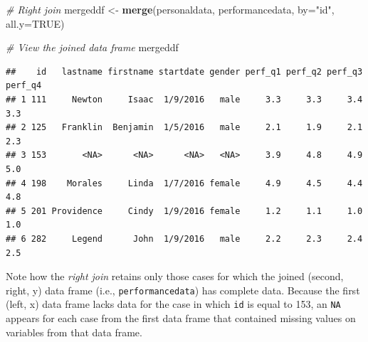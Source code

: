 \documentclass[]{book}
\newenvironment{Shaded}{\begin{snugshade}}{\end{snugshade}}
\newcommand{\KeywordTok}[1]{\textcolor[rgb]{0.13,0.29,0.53}{\textbf{#1}}}
\newcommand{\DataTypeTok}[1]{\textcolor[rgb]{0.13,0.29,0.53}{#1}}
\newcommand{\StringTok}[1]{\textcolor[rgb]{0.31,0.60,0.02}{#1}}
\newcommand{\CommentTok}[1]{\textcolor[rgb]{0.56,0.35,0.01}{\textit{#1}}}
\newcommand{\OtherTok}[1]{\textcolor[rgb]{0.56,0.35,0.01}{#1}}
\newcommand{\NormalTok}[1]{#1}
\begin{document}
\begin{Shaded}
\begin{Highlighting}[]
\CommentTok{# Right join }
\NormalTok{mergeddf <-}\StringTok{ }\KeywordTok{merge}\NormalTok{(personaldata, performancedata, }\DataTypeTok{by=}\StringTok{"id"}\NormalTok{, }\DataTypeTok{all.y=}\OtherTok{TRUE}\NormalTok{)}

\CommentTok{# View the joined data frame}
\NormalTok{mergeddf}
\end{Highlighting}
\end{Shaded}

\begin{verbatim}
##    id   lastname firstname startdate gender perf_q1 perf_q2 perf_q3 perf_q4
## 1 111     Newton     Isaac  1/9/2016   male     3.3     3.3     3.4     3.3
## 2 125   Franklin  Benjamin  1/5/2016   male     2.1     1.9     2.1     2.3
## 3 153       <NA>      <NA>      <NA>   <NA>     3.9     4.8     4.9     5.0
## 4 198    Morales     Linda  1/7/2016 female     4.9     4.5     4.4     4.8
## 5 201 Providence     Cindy  1/9/2016 female     1.2     1.1     1.0     1.0
## 6 282     Legend      John  1/9/2016   male     2.2     2.3     2.4     2.5
\end{verbatim}

Note how the \emph{right join} retains only those cases for which the
joined (second, right, y) data frame (i.e., \texttt{performancedata})
has complete data. Because the first (left, x) data frame lacks data for
the case in which \texttt{id} is equal to 153, an \texttt{NA} appears
for each case from the first data frame that contained missing values on
variables from that data frame.


\end{document}
